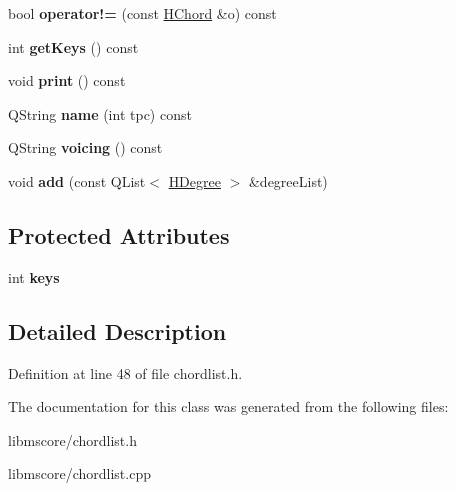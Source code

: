\begin{DoxyCompactItemize}
\item 
\mbox{\label{class_ms_1_1_h_chord_aa67c94534f6f142c126d1feaf4315e5b}} 
bool {\bfseries operator!=} (const \hyperlink{class_ms_1_1_h_chord}{H\+Chord} \&o) const
\item 
\mbox{\label{class_ms_1_1_h_chord_a6fded64babd597f92ad1ed8014cae964}} 
int {\bfseries get\+Keys} () const
\item 
\mbox{\label{class_ms_1_1_h_chord_a18a71673e6c587da80b3ec0b5cca6644}} 
void {\bfseries print} () const
\item 
\mbox{\label{class_ms_1_1_h_chord_a39e11148273de0a5325cf58dd8b68905}} 
Q\+String {\bfseries name} (int tpc) const
\item 
\mbox{\label{class_ms_1_1_h_chord_a045d2e4f37c78d8637f58ad4486d34e3}} 
Q\+String {\bfseries voicing} () const
\item 
\mbox{\label{class_ms_1_1_h_chord_aebe0b0ed765060bd578ef65988c25289}} 
void {\bfseries add} (const Q\+List$<$ \hyperlink{class_ms_1_1_h_degree}{H\+Degree} $>$ \&degree\+List)
\end{DoxyCompactItemize}
\subsection*{Protected Attributes}
\begin{DoxyCompactItemize}
\item 
\mbox{\label{class_ms_1_1_h_chord_ab9d53050d325b54faaa23104236025e1}} 
int {\bfseries keys}
\end{DoxyCompactItemize}


\subsection{Detailed Description}


Definition at line 48 of file chordlist.\+h.



The documentation for this class was generated from the following files\+:\begin{DoxyCompactItemize}
\item 
libmscore/chordlist.\+h\item 
libmscore/chordlist.\+cpp\end{DoxyCompactItemize}
